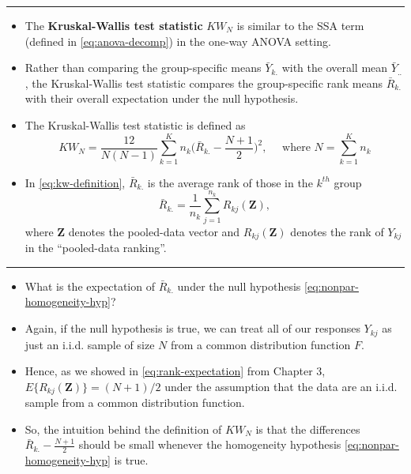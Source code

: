 \documentclass[]{book}
\begin{document}
\begin{center}\rule{0.5\linewidth}{\linethickness}\end{center}

\begin{itemize}
\item
  The \textbf{Kruskal-Wallis test statistic} \(KW_{N}\) is similar to the SSA term (defined in \eqref{eq:anova-decomp})
  in the one-way ANOVA setting.
\item
  Rather than comparing the group-specific means \(\bar{Y}_{k.}\) with the overall mean \(\bar{Y}_{..}\),
  the Kruskal-Wallis test statistic compares the group-specific rank
  means \(\bar{R}_{k.}\) with their overall expectation under the null hypothesis.
\item
  The Kruskal-Wallis test statistic is defined as
  \begin{equation}
  KW_{N} = \frac{12}{N(N-1)}\sum_{k=1}^{K} n_{k}\Big( \bar{R}_{k.} - \frac{N + 1}{2} \Big)^{2}, \quad \textrm{ where } N = \sum_{k=1}^{K} n_{k}
  \label{eq:kw-definition}
  \end{equation}
\item
  In \eqref{eq:kw-definition}, \(\bar{R}_{k.}\) is the average rank of those in the \(k^{th}\) group
  \begin{equation}
  \bar{R}_{k.} = \frac{1}{n_{k}} \sum_{j=1}^{n_{k}} R_{kj}(\mathbf{Z}),
  \end{equation}
  where \(\mathbf{Z}\) denotes the pooled-data vector and \(R_{kj}(\mathbf{Z})\) denotes
  the rank of \(Y_{kj}\) in the ``pooled-data ranking''.
\end{itemize}

\begin{center}\rule{0.5\linewidth}{\linethickness}\end{center}

\begin{itemize}
\item
  What is the expectation of \(\bar{R}_{k.}\) under the null hypothesis \eqref{eq:nonpar-homogeneity-hyp}?
\item
  Again, if the null hypothesis is true, we can treat all of our responses \(Y_{kj}\) as just
  an i.i.d. sample of size \(N\) from a common distribution function \(F\).
\item
  Hence, as we showed in \eqref{eq:rank-expectation} from Chapter 3, \(E\{ R_{kj}(\mathbf{Z}) \} = (N+1)/2\) under the
  assumption that the data are an i.i.d. sample from a common distribution function.
\item
  So, the intuition behind the definition of \(KW_{N}\) is that the differences
  \(\bar{R}_{k.} - \frac{N + 1}{2}\) should be small whenever the homogeneity
  hypothesis \eqref{eq:nonpar-homogeneity-hyp} is true.
\end{itemize}
\end{document}
